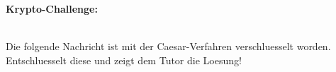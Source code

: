 \documentclass[12pt,a4paper,oneside,ngerman]{scrbook}
\begin{document}
\noindent
\Large{\textbf{Krypto-Challenge: }}\normalsize 
\begin{description}
\item \hfill \\
Die folgende Nachricht ist mit der Caesar-Verfahren verschluesselt worden. Entschluesselt diese und zeigt dem Tutor die Loesung! \\

\item[Nachricht:] \cipher \hfill \\ \\
\item[Loesung:] \dotfill \\ \\
\\
\renewcommand{\arraystretch}{2}

\end{description}
\end{document}
